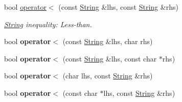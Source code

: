 {\bf }\par
\begin{DoxyCompactItemize}
\item 
bool \hyperlink{classString_ad94401dcf2dfb1476aa89ca9835170b5}{operator$<$} (const \hyperlink{classString}{String} \&lhs, const \hyperlink{classString}{String} \&rhs)
\begin{DoxyCompactList}\small\item\em \hyperlink{classString}{String} inequality\-: Less-\/than. \end{DoxyCompactList}\item 
\hypertarget{classString_a46c921e0ffb91214fbcd9917ae55ebac}{bool {\bfseries operator$<$} (const \hyperlink{classString}{String} \&lhs, char rhs)}\label{classString_a46c921e0ffb91214fbcd9917ae55ebac}

\item 
\hypertarget{classString_ab6704f416891347d26ebbc5bc9401a3a}{bool {\bfseries operator$<$} (const \hyperlink{classString}{String} \&lhs, const char $\ast$rhs)}\label{classString_ab6704f416891347d26ebbc5bc9401a3a}

\item 
\hypertarget{classString_aee8e05b5eeae44c055b159f835bad40b}{bool {\bfseries operator$<$} (char lhs, const \hyperlink{classString}{String} \&rhs)}\label{classString_aee8e05b5eeae44c055b159f835bad40b}

\item 
\hypertarget{classString_a29ed7eb9bc181d1df7f5c55ca6246b60}{bool {\bfseries operator$<$} (const char $\ast$lhs, const \hyperlink{classString}{String} \&rhs)}\label{classString_a29ed7eb9bc181d1df7f5c55ca6246b60}

\end{DoxyCompactItemize}

